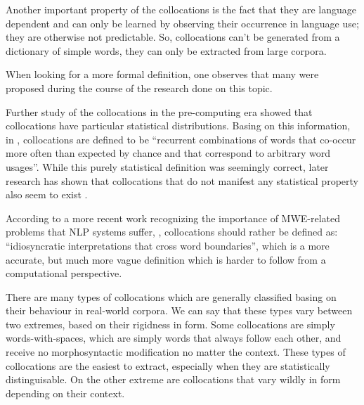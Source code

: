 \documentclass[a4paper,12pt,oneside]{article}
\begin{document}
Another important property of the collocations is the fact that they are language dependent and can only be learned by observing their occurrence in language use; they are otherwise not predictable\cite{seretan2003}. So, collocations can't be generated from a dictionary of simple words, they can only be extracted from large corpora.

When looking for a more formal definition, one observes that many were proposed during the course of the research done on this topic.

Further study of the collocations in the pre-computing era showed that collocations have particular statistical distributions.
Basing on this information, in \cite{smadja93}, collocations are defined to be ``recurrent combinations of words that co-occur more often than expected by chance and that correspond to arbitrary word usages''.
While this purely statistical definition was seemingly correct, later research has shown that collocations that do not manifest any statistical property also seem to exist \cite{1118854}.

According to a more recent work recognizing the importance of MWE-related problems that NLP systems suffer, \cite{sag02multiword}, collocations should rather be defined as: ``idiosyncratic interpretations that cross word boundaries'', which is a more accurate, but much more vague definition which is harder to follow from a computational perspective.

There are many types of collocations which are generally classified basing on their behaviour in real-world corpora. We can say that these types vary between two extremes, based on their rigidness in form. Some collocations are simply words-with-spaces, which are simply words that always follow each other, and receive no morphosyntactic modification no matter the context. These types of collocations are the easiest to extract, especially when they are statistically distinguisable. On the other extreme are collocations that vary wildly in form depending on their context.
\end{document}
